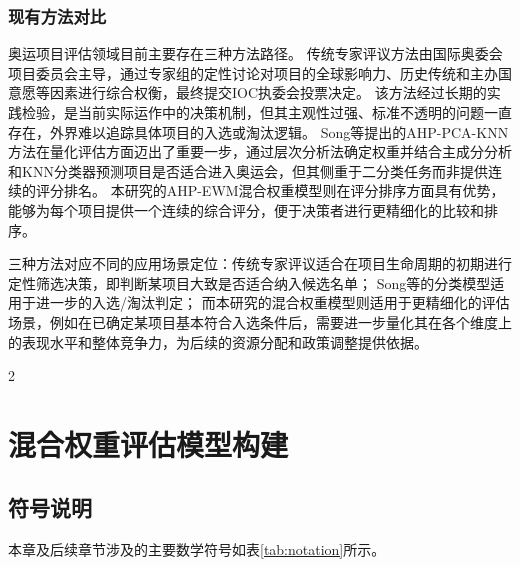 \documentclass[twoside]{CUGThesis}
\begin{document}
\subsubsection{现有方法对比}

奥运项目评估领域目前主要存在三种方法路径。
传统专家评议方法由国际奥委会项目委员会主导，通过专家组的定性讨论对项目的全球影响力、历史传统和主办国意愿等因素进行综合权衡，最终提交IOC执委会投票决定\cite{Li2013,IOC2023}。
该方法经过长期的实践检验，是当前实际运作中的决策机制，但其主观性过强、标准不透明的问题一直存在，外界难以追踪具体项目的入选或淘汰逻辑。
Song等\cite{Song2025}提出的AHP-PCA-KNN方法在量化评估方面迈出了重要一步，通过层次分析法确定权重并结合主成分分析和KNN分类器预测项目是否适合进入奥运会，但其侧重于二分类任务而非提供连续的评分排名。
本研究的AHP-EWM混合权重模型则在评分排序方面具有优势，能够为每个项目提供一个连续的综合评分，便于决策者进行更精细化的比较和排序。

三种方法对应不同的应用场景定位：传统专家评议适合在项目生命周期的初期进行定性筛选决策，即判断某项目大致是否适合纳入候选名单；
Song等的分类模型适用于进一步的入选/淘汰判定；
而本研究的混合权重模型则适用于更精细化的评估场景，例如在已确定某项目基本符合入选条件后，需要进一步量化其在各个维度上的表现水平和整体竞争力，为后续的资源分配和政策调整提供依据。

\begin{spacing}{2}\section{混合权重评估模型构建}\end{spacing}

\subsection{符号说明}

本章及后续章节涉及的主要数学符号如表\ref{tab:notation}所示。
\end{document}
